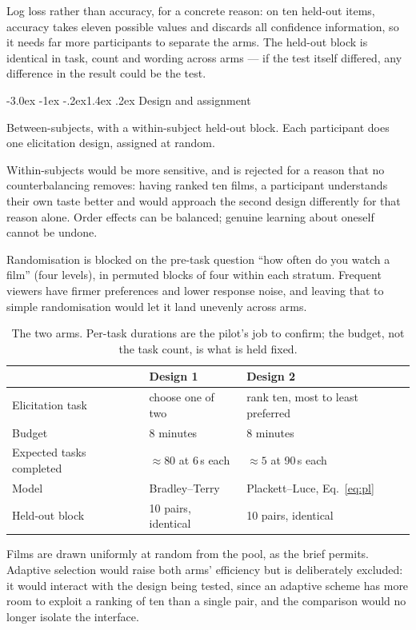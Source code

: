 \documentclass[11pt,a4paper]{article}
\makeatletter
\renewcommand\subsection{\@startsection{subsection}{2}{\z@}%
  {-3.0ex \@plus -1ex \@minus -.2ex}{1.4ex \@plus .2ex}%
  {\normalfont\large\sffamily\bfseries\color{accent}}}
\makeatother
\begin{document}
Log loss rather than accuracy, for a concrete reason: on ten held-out items,
accuracy takes eleven possible values and discards all confidence information, so
it needs far more participants to separate the arms. The held-out block is
identical in task, count and wording across arms --- if the test itself differed,
any difference in the result could be the test.

\subsection{Design and assignment}

Between-subjects, with a within-subject held-out block. Each participant does one
elicitation design, assigned at random.

Within-subjects would be more sensitive, and is rejected for a reason that no
counterbalancing removes: having ranked ten films, a participant understands
their own taste better and would approach the second design differently for that
reason alone. Order effects can be balanced; genuine learning about oneself
cannot be undone.

Randomisation is blocked on the pre-task question ``how often do you watch a
film'' (four levels), in permuted blocks of four within each stratum. Frequent
viewers have firmer preferences and lower response noise, and leaving that to
simple randomisation would let it land unevenly across arms.

\begin{table}[H]
\centering\small
\begin{tabularx}{\textwidth}{lXX}
\toprule
& \textbf{Design 1} & \textbf{Design 2} \\
\midrule
Elicitation task & choose one of two & rank ten, most to least preferred \\
Budget & 8 minutes & 8 minutes \\
Expected tasks completed & $\approx 80$ at 6\,s each & $\approx 5$ at 90\,s each \\
Model & Bradley--Terry & Plackett--Luce, Eq.~\eqref{eq:pl} \\
Held-out block & 10 pairs, identical & 10 pairs, identical \\
\bottomrule
\end{tabularx}
\caption{The two arms. Per-task durations are the pilot's job to confirm; the
budget, not the task count, is what is held fixed.}
\end{table}

Films are drawn uniformly at random from the pool, as the brief permits. Adaptive
selection would raise both arms' efficiency but is deliberately excluded: it
would interact with the design being tested, since an adaptive scheme has more
room to exploit a ranking of ten than a single pair, and the comparison would no
longer isolate the interface.
\end{document}
